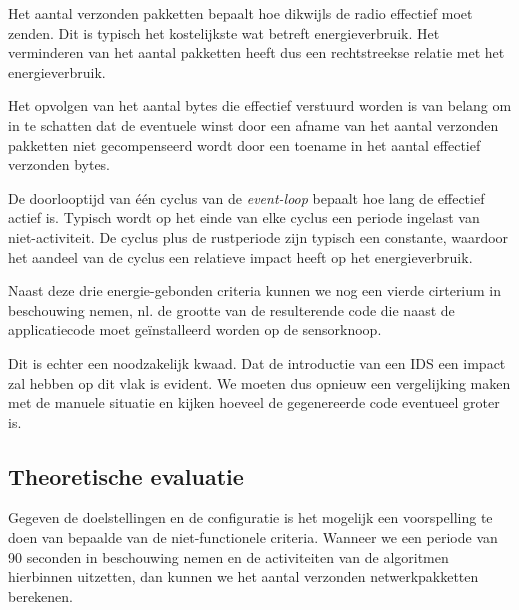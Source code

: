 \begin{description}[noitemsep, topsep=0pt, partopsep=0pt]
  
  \item[Aantal verzonden netwerkpakketten] Het aantal verzonden pakketten
  bepaalt hoe dikwijls de radio effectief moet zenden. Dit is typisch het
  kostelijkste wat betreft energieverbruik. Het verminderen van het aantal
  pakketten heeft dus een rechtstreekse relatie met het energieverbruik.

  \item[Aantal verzonden bytes] Het opvolgen van het aantal bytes die effectief
  verstuurd worden is van belang om in te schatten dat de eventuele winst door
  een afname van het aantal verzonden pakketten niet gecompenseerd wordt door
  een toename in het aantal effectief verzonden bytes.

  \item[Lengte event-loop] De doorlooptijd van \'e\'en cyclus van de
  \emph{event-loop} bepaalt hoe lang de \mcu effectief actief is. Typisch wordt
  op het einde van elke cyclus een periode ingelast van niet-activiteit. De
  cyclus plus de rustperiode zijn typisch een constante, waardoor het aandeel
  van de cyclus een relatieve impact heeft op het energieverbruik.
  
\end{description}

Naast deze drie energie-gebonden criteria kunnen we nog een vierde cirterium in
beschouwing nemen, nl. de grootte van de resulterende code die naast de
applicatiecode moet ge\"installeerd worden op de sensorknoop.

Dit is echter een noodzakelijk kwaad. Dat de introductie van een IDS een impact
zal hebben op dit vlak is evident. We moeten dus opnieuw een vergelijking maken
met de manuele situatie en kijken hoeveel de gegenereerde code eventueel groter
is.

\vspace{-3mm}

\subsection{Theoretische evaluatie}

Gegeven de doelstellingen en de configuratie is het mogelijk een voorspelling
te doen van bepaalde van de niet-functionele criteria. Wanneer we een periode
van 90 seconden in beschouwing nemen en de activiteiten van de algoritmen
hierbinnen uitzetten, dan kunnen we het aantal verzonden netwerkpakketten
berekenen.

